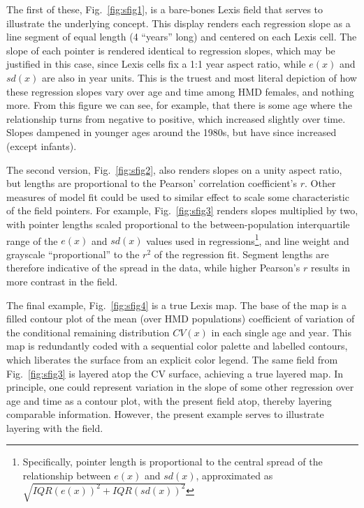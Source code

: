 \documentclass{article}
\begin{document}
The first of these, Fig.~\ref{fig:sfig1}, is a bare-bones Lexis field that serves to illustrate the underlying concept. This display renders each regression slope as a line segment of equal length (4 ``years'' long) and centered on each Lexis cell. The slope of each pointer is rendered identical to regression slopes, which may be justified in this case, since Lexis cells fix a 1:1 year aspect ratio, while $e(x)$ and $sd(x)$ are also in year units. This is the truest and most literal depiction of how these regression slopes vary over age and time among HMD females, and nothing more. From this figure we can see, for example, that there is some age where the relationship turns from negative to positive, which increased slightly over time. Slopes dampened in younger ages around the 1980s, but have since increased (except infants).

The second version, Fig.~\ref{fig:sfig2}, also renders slopes on a unity aspect ratio, but lengths are proportional to the Pearson' correlation coefficient's $r$. Other measures of model fit could be used to similar effect to scale some characteristic of the field pointers. For example, Fig.~\ref{fig:sfig3} renders slopes multiplied by two, with pointer lengths scaled proportional to the between-population interquartile range of the $e(x)$ and $sd(x)$ values used in regressions\footnote{Specifically, pointer length is proportional to the central spread of the relationship between $e(x)$ and $sd(x)$, approximated as $\sqrt{IQR(e(x))^2 + IQR(sd(x))^2}$}, and line weight and grayscale ``proportional'' to the $r^2$ of the regression fit. Segment lengths are therefore indicative of the spread in the data, while higher Pearson's $r$ results in more contrast in the field. 

The final example, Fig.~\ref{fig:sfig4} is a true Lexis map. The base of the map is a filled contour plot of the mean (over HMD populations) coefficient of variation of the conditional remaining distribution $CV(x)$ in each single age and year. This map is redundantly coded with a sequential color palette and labelled contours, which liberates the surface from an explicit color legend. The same field from Fig.~\ref{fig:sfig3} is layered atop the CV surface, achieving a true layered map. In principle, one could represent variation in the slope of some other regression over age and time as a contour plot, with the present field atop, thereby layering comparable information. However, the present example serves to illustrate layering with the field.
\end{document}
